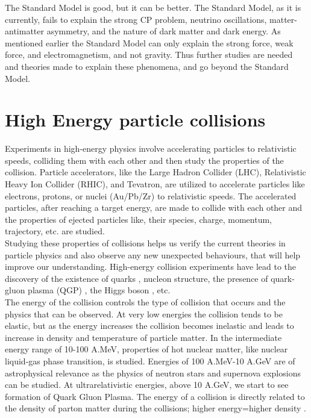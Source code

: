 \documentclass[12pt,a4paper,twoside]{report}
\begin{document}
The Standard Model is good, but it can be better. The Standard Model, as it  is currently, fails to explain the strong CP problem\cite{Ref:CPviolation}, neutrino oscillations\cite{Ref:neutrino-oscill}, matter-antimatter asymmetry\cite{Ref:matter-antimatter-prob}, and the nature of dark matter and dark energy\cite{Ref:dark-matter-y-energy}. As mentioned earlier the Standard Model can only explain the strong force, weak force, and electromagnetism, and not gravity. Thus further studies are needed and theories made to explain these phenomena, and go beyond the Standard Model.\\
\section{High Energy particle collisions}
Experiments in high-energy physics involve accelerating particles to relativistic speeds, colliding them with each other and then study the properties of the collision. Particle accelerators, like the Large Hadron Collider (LHC), Relativistic Heavy Ion Collider (RHIC), and Tevatron, are utilized to accelerate particles like electrons, protons, or nuclei (Au/Pb/Zr) to relativistic speeds. The accelerated particles, after reaching a target energy, are made to collide with each other and the properties of ejected particles like, their species, charge, momentum, trajectory, etc. are studied.\\
Studying these properties of collisions helps us verify the current theories in particle physics and also observe any new unexpected behaviours, that will help improve our understanding. High-energy collision experiments have lead to the discovery of the existence of quarks \cite{Ref:quarkpaper1}\cite{Ref:quarkpaper2}, nucleon structure, the presence of quark-gluon plasma (QGP) \cite{Ref:QGP-discovery}, the Higgs boson \cite{Ref:higgs-ATLAS}\cite{Ref:higgs-CMS}, etc.\\
The energy of the collision controls the type of collision that occurs and the physics that can be observed. At very low energies the collision tends to be elastic, but as the energy increases the collision becomes inelastic and leads to increase in density and temperature of particle matter. In the intermediate energy range of 10-100 A.MeV, properties of hot nuclear matter, like nuclear liquid-gas phase transition, is studied. Energies of 100 A.MeV-10 A.GeV are of astrophysical relevance as the physics of neutron stars and supernova explosions can be studied. At ultrarelativistic energies, above 10 A.GeV, we start to see formation of Quark Gluon Plasma. The energy of a collision is directly related to the density of parton matter during the collisions; higher energy=higher density \cite{Ref:Csernai}.\\
\end{document}
